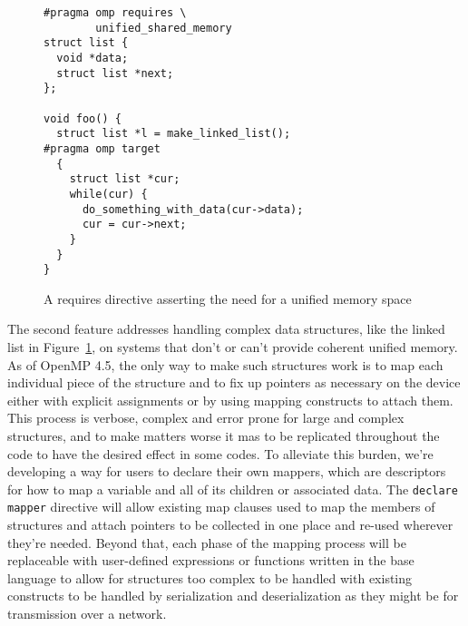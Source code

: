 \begin{figure}
\begin{verbatim}
#pragma omp requires \
        unified_shared_memory
struct list {
  void *data;
  struct list *next;
};

void foo() {
  struct list *l = make_linked_list();
#pragma omp target
  {
    struct list *cur;
    while(cur) {
      do_something_with_data(cur->data);
      cur = cur->next;
    }
  }
}
\end{verbatim}
\caption{A requires directive asserting the need for a unified memory space}
\label{fig:unified}
\end{figure}

The second feature addresses handling complex data structures, like the linked
list in Figure~\ref{fig:unified}, on systems that don't or can't provide
coherent unified memory.  As of OpenMP 4.5, the only way to make such structures
work is to map each individual piece of the structure and to fix up pointers as
necessary on the device either with explicit assignments or by using mapping
constructs to attach them.  This process is verbose, complex and error prone for
large and complex structures, and to make matters worse it mas to be replicated
throughout the code to have the desired effect in some codes.  To alleviate this
burden, we're developing a way for users to declare their own mappers, which are
descriptors for how to map a variable and all of its children or associated
data.  The \texttt{declare mapper} directive will allow existing map clauses
used to map the members of structures and attach pointers to be collected in
one place and re-used wherever they're needed.  Beyond that, each phase of the
mapping process will be replaceable with user-defined expressions or functions
written in the base language to allow for structures too complex to be handled
with existing constructs to be handled by serialization and deserialization as
they might be for transmission over a network.



